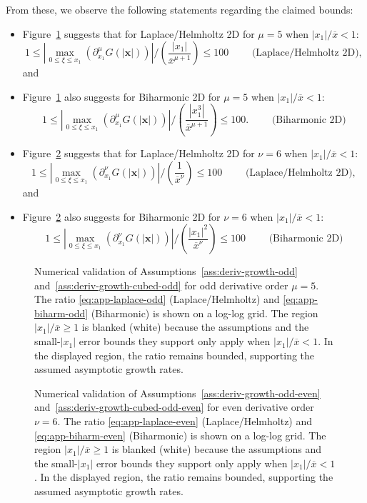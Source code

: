 \documentclass[12pt]{article}
\let\b=\boldsymbol
\theoremstyle{definition}
\theoremstyle{plain}
\theoremstyle{definition}
\begin{document}
From these, we observe the following statements regarding the claimed bounds:
\begin{itemize}
\item Figure~\ref{fig:fig10} suggests that for Laplace/Helmholtz 2D for $\mu = 5$ when $|x_1|/\overline{x} < 1$:
\[
1\leq \left|\max_{0\leq \xi\leq x_1}\left(\partial^{\mu}_{x_1}G(|\b{x}|)\right) \right| / \left(\frac{|x_1|}{\overline{x}^{\mu+1}} \right) \leq 100 \qquad\text{ (Laplace/Helmholtz 2D)},
\]
and
\item Figure~\ref{fig:fig10} also suggests for Biharmonic 2D for $\mu = 5$ when $|x_1|/\overline{x} < 1$:
\[
1\leq \left|\max_{0\leq \xi\leq x_1}\left(\partial^{\mu}_{x_1}G(|\b{x}|)\right) \right| / \left(\frac{|x_1^3|}{\overline{x}^{\mu+1}} \right) \leq 100. \qquad\text{ (Biharmonic 2D)}
\]
\item Figure~\ref{fig:fig11} suggests that for Laplace/Helmholtz 2D for $\nu = 6$ when $|x_1|/\overline{x} < 1$:
\[
1\leq \left|\max_{0\leq \xi\leq x_1}\left(\partial^{\nu}_{x_1}G(|\b{x}|)\right) \right| / \left(\frac{1}{\overline{x}^{\nu}} \right) \leq 100 \qquad\text{ (Laplace/Helmholtz 2D)},
\]
and
\item Figure~\ref{fig:fig11} also suggests for Biharmonic 2D for $\nu = 6$ when $|x_1|/\overline{x} < 1$:
\[
1\leq \left|\max_{0\leq \xi\leq x_1}\left(\partial^{\nu}_{x_1}G(|\b{x}|)\right) \right| / \left(\frac{|x_1|^2}{\overline{x}^{\nu}} \right) \leq 100 \qquad\text{ (Biharmonic 2D)}
\]
\end{itemize}



\begin{figure}[h]
\centering


\caption{Numerical validation of Assumptions~\ref{ass:deriv-growth-odd} and~\ref{ass:deriv-growth-cubed-odd} for odd derivative order $\mu=5$. The ratio \eqref{eq:app-laplace-odd} (Laplace/Helmholtz) and \eqref{eq:app-biharm-odd} (Biharmonic) is shown on a log-log grid. The region $|x_1|/\overline{x} \geq 1$ is blanked (white) because the assumptions and the small-$|x_1|$ error bounds they support only apply when $|x_1|/\overline{x} < 1$. In the displayed region, the ratio remains bounded, supporting the assumed asymptotic growth rates.}
\label{fig:fig10}
\end{figure}

\begin{figure}[h]
\centering


\caption{Numerical validation of Assumptions~\ref{ass:deriv-growth-odd-even} and~\ref{ass:deriv-growth-cubed-odd-even} for even derivative order $\nu=6$. The ratio \eqref{eq:app-laplace-even} (Laplace/Helmholtz) and \eqref{eq:app-biharm-even} (Biharmonic) is shown on a log-log grid. The region $|x_1|/\overline{x} \geq 1$ is blanked (white) because the assumptions and the small-$|x_1|$ error bounds they support only apply when $|x_1|/\overline{x} < 1$. In the displayed region, the ratio remains bounded, supporting the assumed asymptotic growth rates.}
\label{fig:fig11}
\end{figure}
\end{document}
